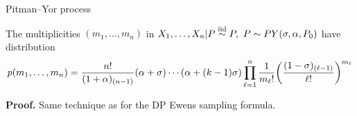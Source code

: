 \begin{frame}[allowframebreaks]{Pitman--Yor process}
	\begin{proposition}
 The multiplicities $(m_1,\ldots,m_n)$ in $X_1,\ldots, X_n|P\stackrel{\mbox{\scriptsize{iid}}}{\sim} P,\ P\sim PY(\sigma, \alpha, P_0)$ have distribution
\begin{equation*}
    p(m_1,\ldots,m_n)=\frac{n!}{(1+\alpha)_{(n-1)}}(\alpha +\sigma)\cdots (\alpha+(k-1)\sigma)\prod_{\ell=1}^n\frac{1}{m_\ell!}\bigg(\frac{(1-\sigma)_{(\ell-1)} }{\ell!}\bigg)^{m_\ell}
\end{equation*}
\end{proposition}


\textbf{Proof.}
Same technique as for the DP Ewens sampling formula.



\framebreak

\begin{columns}


\end{columns}
\end{frame}
